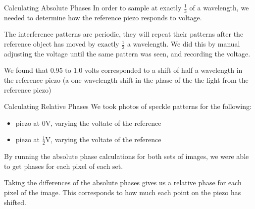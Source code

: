 \documentclass[pdf]{beamer}
\begin{document}
\begin{frame}{Calculating Absolute Phases}
In order to sample at exactly $\frac13$ of a wavelength, we needed to determine how the reference piezo responds to voltage.

\vspace{.5cm}
The interference patterns are periodic, they will repeat their patterns after the reference object has moved by exactly $\frac12$ a wavelength. We did this by manual adjusting the voltage until the same pattern was seen, and recording the voltage.

\vspace{.5cm}
We found that 0.95 to 1.0 volts corresponded to a shift of half a wavelength in the reference piezo (a one wavelength shift in the phase of the the light from the reference piezo)



\end{frame}

\begin{frame}{Calculating Relative Phases}
We took photos of speckle patterns for the following:
\begin{itemize}
	\item piezo at 0V, varying the voltate of the reference
	\item piezo at $\frac12$V, varying the voltate of the reference
\end{itemize}
By running the absolute phase calculations for both sets of images, we were able to get phases for each pixel of each set.

\vspace{0.5cm}
Taking the differences of the absolute phases gives us a relative phase for each pixel of the image. This corresponds to how much each point on the piezo has shifted.
\end{frame}
\end{document}
